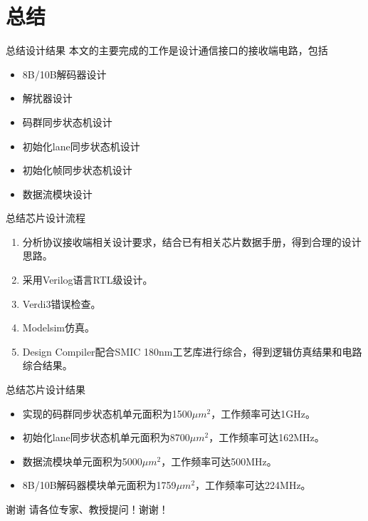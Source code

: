 \documentclass{beamer}
\begin{document}
\section{总结}

\begin{frame}{总结}{设计结果}
	本文的主要完成的工作是设计通信接口的接收端电路，包括
	\begin{itemize}
	\item 8B/10B解码器设计
	\item 解扰器设计
	\item 码群同步状态机设计
	\item 初始化lane同步状态机设计
	\item 初始化帧同步状态机设计
  \item 数据流模块设计
	\end{itemize}
\end{frame}

\begin{frame}{总结}{芯片设计流程}
	\begin{enumerate}
	\item 分析协议接收端相关设计要求，结合已有相关芯片数据手册，得到合理的设计思路。
  \item 采用Verilog语言RTL级设计。
	\item Verdi3错误检查。
	\item Modelsim仿真。
	\item Design Compiler配合SMIC 180nm工艺库进行综合，得到逻辑仿真结果和电路综合结果。
  \end{enumerate}
\end{frame}

\begin{frame}{总结}{芯片设计结果}
	\begin{itemize}
	\item 实现的码群同步状态机单元面积为1500$\mu m^2$，工作频率可达1GHz。
	\item 初始化lane同步状态机单元面积为8700$\mu m^2$，工作频率可达162MHz。
	\item 数据流模块单元面积为5000$\mu m^2$，工作频率可达500MHz。
	\item 8B/10B解码器模块单元面积为1759$\mu m^2$，工作频率可达224MHz。
	\end{itemize}
\end{frame}

\begin{frame}{谢谢}{}
	\centering
	请各位专家、教授提问！谢谢！
\end{frame}
\end{document}

